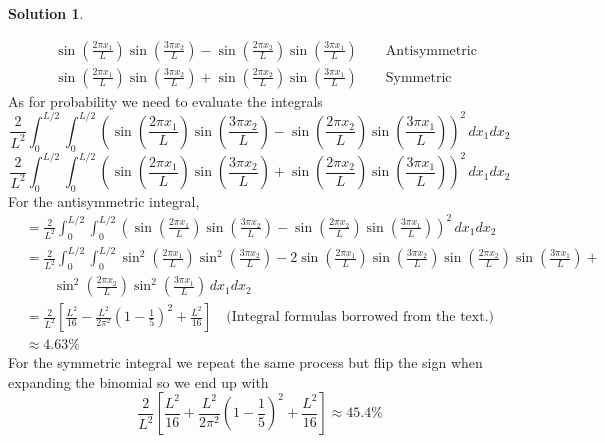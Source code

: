 \documentclass[10pt]{article}
\theoremstyle{definition}
\newtheorem{soln}{Solution}
\begin{document}
\begin{soln}
\begin{enumerate}[label=(\alph*)]
\begin{align*}
             & \sin\left(\frac{2\pi x_1}{L}\right)\sin\left(\frac{3\pi x_2}{L}\right)-\sin\left(\frac{2\pi x_2}{L}\right)\sin\left(\frac{3\pi x_1}{L}\right)\qquad\text{Antisymmetric} \\
             & \sin\left(\frac{2\pi x_1}{L}\right)\sin\left(\frac{3\pi x_2}{L}\right)+\sin\left(\frac{2\pi x_2}{L}\right)\sin\left(\frac{3\pi x_1}{L}\right)\qquad\text{Symmetric}
          \end{align*}
          As for probability we need to evaluate the integrals
          $$\frac{2}{L^2}\int_{0}^{L/2}\int_{0}^{L/2}\left(\sin\left(\frac{2\pi x_1}{L}\right)\sin\left(\frac{3\pi x_2}{L}\right)-\sin\left(\frac{2\pi x_2}{L}\right)\sin\left(\frac{3\pi x_1}{L}\right)\right)^2\,dx_1dx_2$$
          $$\frac{2}{L^2}\int_{0}^{L/2}\int_{0}^{L/2}\left(\sin\left(\frac{2\pi x_1}{L}\right)\sin\left(\frac{3\pi x_2}{L}\right)+\sin\left(\frac{2\pi x_2}{L}\right)\sin\left(\frac{3\pi x_1}{L}\right)\right)^2\,dx_1dx_2$$
          For the antisymmetric integral,
          \begin{align*}
             & = \frac{2}{L^2}\int_{0}^{L/2}\int_{0}^{L/2}\left(\sin\left(\frac{2\pi x_1}{L}\right)\sin\left(\frac{3\pi x_2}{L}\right)-\sin\left(\frac{2\pi x_2}{L}\right)\sin\left(\frac{3\pi x_1}{L}\right)\right)^2\,dx_1dx_2                                                    \\
             & = \frac{2}{L^2}\int_{0}^{L/2}\int_{0}^{L/2}\sin^2\left(\frac{2\pi x_1}{L}\right)\sin^2\left(\frac{3\pi x_2}{L}\right)-2\sin\left(\frac{2\pi x_1}{L}\right)\sin\left(\frac{3\pi x_2}{L}\right)\sin\left(\frac{2\pi x_2}{L}\right)\sin\left(\frac{3\pi x_1}{L}\right)+ \\
             & \qquad \sin^2\left(\frac{2\pi x_2}{L}\right)\sin^2\left(\frac{3\pi x_1}{L}\right)\,dx_1dx_2                                                                                                                                                                          \\
             & = \frac{2}{L^2}\left[\frac{L^2}{16}-\frac{L^2}{2\pi^2}\left(1-\frac{1}{5}\right)^2+\frac{L^2}{16}\right] \quad \text{(Integral formulas borrowed from the text.)}                                                                                                    \\
             & \approx 4.63\%
          \end{align*}
          For the symmetric integral we repeat the same process but flip the sign when expanding the binomial so we end up with
          $$\frac{2}{L^2}\left[\frac{L^2}{16}+\frac{L^2}{2\pi^2}\left(1-\frac{1}{5}\right)^2+\frac{L^2}{16}\right]\approx45.4\%$$
  \end{enumerate}
\end{soln}
\end{document}
